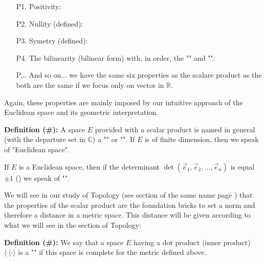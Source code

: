 	\begin{enumerate}
		\item[P1.] Positivity: 
		
	  	
	  	\item[P2.] Nullity (defined): 
	  	 
	  	
	  	\item[P3.] Symetry (defined): 
	  	
	  	
	  	\item[P4.] The bilinearity (bilinear form) with, in order, the "" and "":
	  	
		
		\item[P...] And so on... we have the same six properties as the scalare product as the both are the same if we focus only on vector in $\mathbb{R}$.
	\end{enumerate}
	\begin{tcolorbox}[title=Remark,colframe=black,arc=10pt]
	Again, these properties are mainly imposed by our intuitive approach of the Euclidean space and its geometric interpretation.
	\end{tcolorbox}	
	
	\textbf{Definition (\#\mydef):} A space $E$ provided with a scalar product is named in general (with the departure set in $\mathbb{C}$) a "" or "". If $E$ is of finite dimension, then we speak of "Euclidean space".
	\begin{tcolorbox}[title=Remark,colframe=black,arc=10pt]
	If $E$ is a Euclidean space, then if the determinant $\det(\vec{e}_1,\vec{e}_2,\ldots,\vec{e}_n)$ is equal $\pm 1$ () we speak of "\label{oriented Euclidean space}".
	\end{tcolorbox}	
	
	We will see in our study of Topology (see section of the same name page \pageref{topology}) that the properties of the scalar product are the foundation bricks to set a norm and therefore a distance in a metric space. This distance will be given according to what we will see in the section of Topology:
	
	
	\textbf{Definition (\#\mydef):} We say that a space $E$ having a dot product (inner product) $ \langle \cdot | \cdot \rangle$ is a "" if this space is complete for the metric defined above.
	
